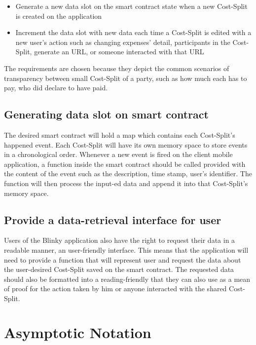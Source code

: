 \documentclass[twoside,numperchapter]{tutthesis} %
\begin{document}
\begin{itemize}
    \item Generate a new data slot on the smart contract state when a new Cost-Split is created on the application
    \item Increment the data slot with new data each time a Cost-Split is edited with a new user's action such as changing expenses' detail, participants in the Cost-Split, generate an URL, or someone interacted with that URL
\end{itemize}

The requirements are chosen because they depict the common scenarios of transparency between small Cost-Split of a party, such as how much each has to pay, who did declare to have paid.

\subsection{Generating data slot on smart contract}

The desired smart contract will hold a map which contains each Cost-Split's happened event. Each Cost-Split will have its own memory space to store events in a chronological order. Whenever a new event is fired on the client mobile application, a function inside the smart contract should be called provided with the content of the event such as the description, time stamp, user's identifier. The function will then process the input-ed data and append it into that Cost-Split's memory space.

\subsection{Provide a data-retrieval interface for user}

Users of the Blinky application also have the right to request their data in a readable manner, an user-friendly interface. This means that the application will need to provide a function that will represent user and request the data about the user-desired Cost-Split saved on the smart contract. The requested data should also be formatted into a reading-friendly that they can also use as a mean of proof for the action taken by him or anyone interacted with the shared Cost-Split.

\section{Asymptotic Notation}
\end{document}

